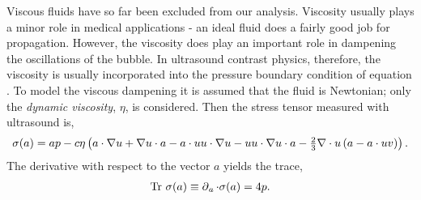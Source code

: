 Viscous fluids have so far been excluded from our analysis.
Viscosity usually plays a minor role in medical applications - 
an ideal fluid does a fairly good job for propagation.
However, the viscosity does play an important role in dampening the oscillations of the bubble.
In ultrasound contrast physics, therefore, the viscosity is usually incorporated into the pressure boundary condition of equation .
To model the viscous dampening it is assumed that the fluid is Newtonian; only the  {\em  dynamic viscosity}, $\eta$, is considered. %
Then the stress tensor measured with ultrasound is\cite{LandauBook}, 
\begin{align}
  \sigma(a) = a p - c\eta \left( a \cdot \nabla u + \nabla u\cdot a - a\cdot u u\cdot \nabla u - u u \cdot \nabla  u\cdot a -\tfrac{2}{3}\nabla \cdot u \left( a - a\cdot u v \right) \right).\label{eqn:RelStress}
\end{align}
The derivative with respect to the vector $a$ yields the trace\cite{Hestenes1984},
\begin{align}
  \textrm{Tr}\ \sigma(a) \equiv \operatorname{\partial}_a \cdot \sigma(a) = 4p. \label{eqn:RelStressTrace} 
\end{align}

